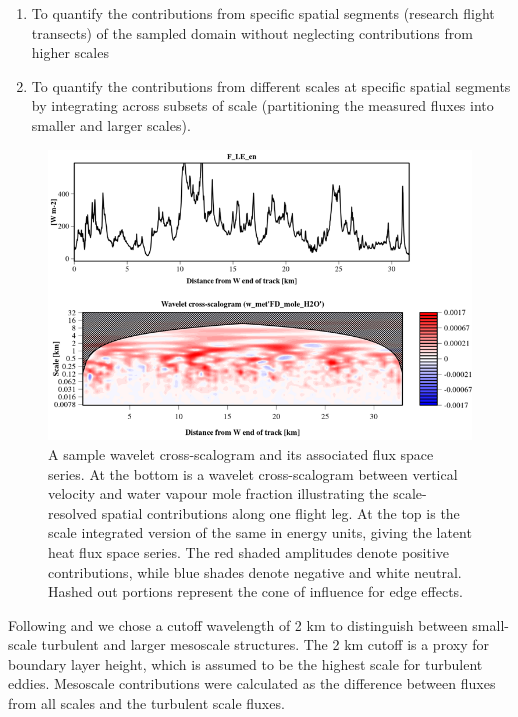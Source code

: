 \documentclass[draft]{agujournal2019}
\begin{document}
\begin{enumerate}
    \item To quantify the contributions from specific spatial segments (research flight transects) of the sampled domain without neglecting contributions from higher scales 
    \item To quantify the contributions from different scales at specific spatial segments by integrating across subsets of scale (partitioning the measured fluxes into smaller and larger scales). 
\end{enumerate}
 \begin{figure}
 \noindent\includegraphics[width=\textwidth]{figures_main/wavelet_ex.png}
\caption{A sample wavelet cross-scalogram and its associated flux space series. At the bottom is a wavelet cross-scalogram between vertical velocity and water vapour mole fraction illustrating the scale-resolved spatial contributions along one flight leg. At the top is the scale integrated version of the same in energy units, giving the latent heat flux space series. The red shaded amplitudes denote positive contributions, while blue shades denote negative and white neutral. Hashed out portions represent the cone of influence for edge effects.}
\label{fig:wavelet_ex}
 \end{figure}

Following  and  we chose a cutoff wavelength of 2 km to distinguish between small-scale turbulent and larger mesoscale structures. The 2 km cutoff is a proxy for boundary layer height, which is assumed to be the highest scale for turbulent eddies. Mesoscale contributions were calculated as the difference between fluxes from all scales and the turbulent scale fluxes.
\end{document}
